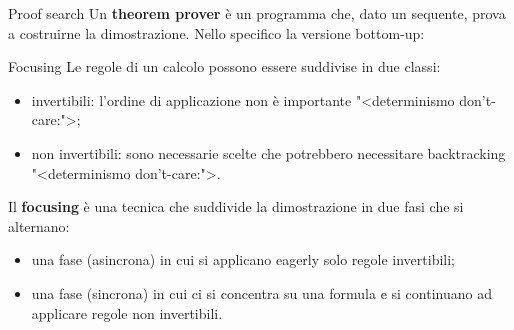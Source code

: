 \documentclass{beamer}
\begin{document}
\begin{frame}{Proof search}
	Un \textbf{theorem prover} è un programma che, dato un sequente, prova a costruirne la dimostrazione.
	Nello specifico la versione bottom-up:
\end{frame}

\begin{frame}{Focusing}
	Le regole di un calcolo possono essere suddivise in due classi:
	\begin{itemize}
		\item invertibili: l'ordine di applicazione non è importante "<determinismo don't-care:">;
		\item non invertibili: sono necessarie scelte che potrebbero necessitare backtracking "<determinismo don't-care:">.
	\end{itemize}
	Il \textbf{focusing} è una tecnica che suddivide la dimostrazione in due fasi che si alternano:
	\begin{itemize}
		\item una fase (asincrona) in cui si applicano eagerly solo regole invertibili;
		\item una fase (sincrona) in cui ci si concentra su una formula e si continuano ad applicare regole non invertibili.
	\end{itemize}
\end{frame}
\end{document}
